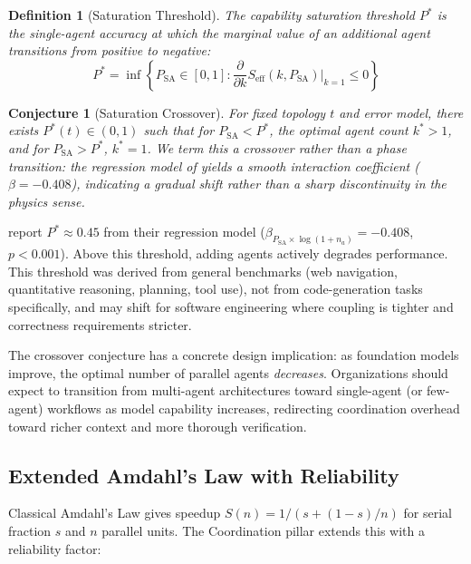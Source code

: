 \documentclass[11pt, a4paper, logo, copyright]{googledeepmind}
\newtheorem{definition}{Definition}[section]
\newtheorem{conjecture}{Conjecture}[section]
\begin{document}
\begin{definition}[Saturation Threshold]
\label{def:saturation}
The capability saturation threshold $P^*$ is the single-agent accuracy at which the marginal value of an additional agent transitions from positive to negative:
\begin{equation}
    P^* = \inf \left\{ P_{\mathrm{SA}} \in [0,1] : \frac{\partial}{\partial k} S_{\mathrm{eff}}(k, P_{\mathrm{SA}}) \Big|_{k=1} \leq 0 \right\}
\end{equation}
\end{definition}

\begin{conjecture}[Saturation Crossover]
\label{conj:phase}
For fixed topology $t$ and error model, there exists $P^*(t) \in (0,1)$ such that for $P_{\mathrm{SA}} < P^*$, the optimal agent count $k^* > 1$, and for $P_{\mathrm{SA}} > P^*$, $k^* = 1$. We term this a crossover rather than a phase transition: the regression model of \citet{kim2025scaling} yields a smooth interaction coefficient ($\beta = -0.408$), indicating a gradual shift rather than a sharp discontinuity in the physics sense.
\end{conjecture}

\citet{kim2025scaling} report $P^* \approx 0.45$ from their regression model ($\beta_{P_{\mathrm{SA}} \times \log(1+n_a)} = -0.408$, $p < 0.001$). Above this threshold, adding agents actively degrades performance. This threshold was derived from general benchmarks (web navigation, quantitative reasoning, planning, tool use), not from code-generation tasks specifically, and may shift for software engineering where coupling is tighter and correctness requirements stricter.

The crossover conjecture has a concrete design implication: as foundation models improve, the optimal number of parallel agents \emph{decreases}. Organizations should expect to transition from multi-agent architectures toward single-agent (or few-agent) workflows as model capability increases, redirecting coordination overhead toward richer context and more thorough verification.

\subsection{Extended Amdahl's Law with Reliability}

Classical Amdahl's Law gives speedup $S(n) = 1/(s + (1-s)/n)$ for serial fraction $s$ and $n$ parallel units. The Coordination pillar extends this with a reliability factor:
\end{document}
